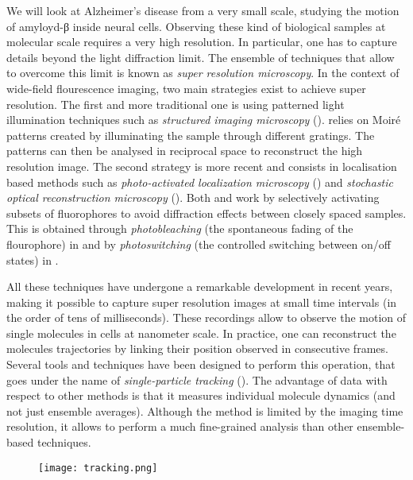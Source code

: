 We will look at Alzheimer's disease from a very small scale, studying the motion of amyloyd-β inside neural cells. Observing these kind of biological samples at molecular scale requires a very high resolution. In particular, one has to capture details beyond the light diffraction limit. The ensemble of techniques that allow to overcome this limit is known as \emph{super resolution microscopy}. In the context of wide-field flourescence imaging, two main strategies exist to achieve super resolution. The first and more traditional one is using patterned light illumination techniques such as \emph{structured imaging microscopy} ().  relies on Moiré patterns created by illuminating the sample through different gratings. The patterns can then be analysed in reciprocal space to reconstruct the high resolution image. The second strategy is more recent and consists in localisation based methods such as \emph{photo-activated localization microscopy} () and \emph{stochastic optical reconstruction microscopy} (). Both  and  work by selectively activating subsets of fluorophores to avoid diffraction effects between closely spaced samples. This is obtained through \emph{photobleaching} (the spontaneous fading of the flourophore) in  and by \emph{photoswitching} (the controlled switching between on/off states) in .

All these techniques have undergone a remarkable development in recent years, making it possible to capture super resolution images at small time intervals (in the order of tens of milliseconds). These recordings allow to observe the motion of single molecules in cells at nanometer scale. In practice, one can reconstruct the molecules trajectories by linking their position observed in consecutive frames. Several tools and techniques have been designed to perform this operation, that goes under the name of \emph{single-particle tracking} (). The advantage of  data with respect to other methods is that it measures individual molecule dynamics (and not just ensemble averages). Although the method is limited by the imaging time resolution, it allows to perform a much fine-grained analysis than other ensemble-based techniques.

\begin{figure}
  \texttt{[image: tracking.png]}
\end{figure}

